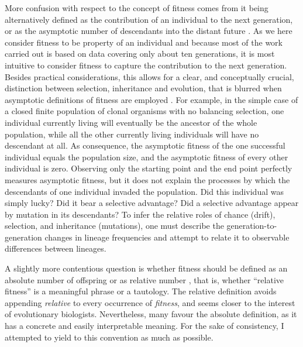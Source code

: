 More confusion with respect to the concept of fitness comes from it being alternatively defined as the contribution of an individual to the next generation, or as the asymptotic number of descendants into the distant future %
 \parencite{Wade2006}. As we here consider fitness to be property of an individual and because most of the work carried out is based on data covering only about ten generations, it is most intuitive to consider fitness to capture the contribution to the next generation. Besides practical considerations, this allows for a clear, and conceptually crucial, distinction between selection, inheritance and evolution, that is blurred when asymptotic definitions of fitness are employed \parencite{Fisher1930, Arnold1984}. For example, in the simple case of a closed finite population of clonal organisms with no balancing selection, one individual currently living will eventually be the ancestor of the whole population, while all the other currently living individuals will have no descendant at all. 
As consequence, the asymptotic fitness of the one successful individual equals the population size, and the asymptotic fitness of every other individual is zero. 
Observing only the starting point and the end point perfectly measures asymptotic fitness, but it does not explain the processes by which the descendants of one individual invaded the population. Did this individual was simply lucky? Did it bear a selective advantage? Did a selective advantage appear by mutation in its descendants? To infer the relative roles of chance (drift), selection, and inheritance (mutations), one must describe the generation-to-generation changes in lineage frequencies and attempt to relate it to observable differences between lineages.

A slightly more contentious question is whether fitness should be defined as an absolute number of offspring \parencite{Wade2006} or as relative number \parencite{Rousset2004}, that is, whether ``relative fitness'' is a meaningful phrase or a tautology. The relative definition avoids appending \emph{relative} to every occurrence of \emph{fitness}, and seems closer to the interest of evolutionary biologists. Nevertheless, many favour the absolute definition, as it has a concrete and easily interpretable meaning. For the sake of consistency, I attempted to yield to this convention as much as possible. 

